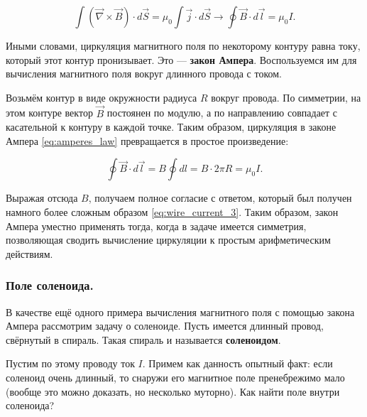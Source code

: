 \documentclass[a4paper,12pt]{article}
\numberwithin{equation}{section}
\newcommand{\vn}{\vec{\nabla}}
\begin{document}
\begin{equation}
  \label{eq:amperes_law}
  \int \left( \vn \times \vec{B} \right) \cdot d \vec{S} =
  \mu_0 \int \vec{j} \cdot d\vec{S} \rightarrow  \oint
  \vec{B} \cdot d\vec{l} = \mu_0 I.
\end{equation}

Иными словами, циркуляция магнитного поля по некоторому контуру равна
току, который этот контур пронизывает. Это --- \textbf{закон
  Ампера}. Воспользуемся им для вычисления магнитного поля вокруг
длинного провода с током. 

\begin{figure}
\centering
{}
\label{fig:current_wire_field}
\end{figure}

Возьмём контур в виде окружности радиуса $R$ вокруг провода. По
симметрии, на этом контуре вектор $\vec{B}$ постоянен по модулю, а по
направлению совпадает с касательной к контуру в каждой точке. Таким
образом, циркуляция в законе Ампера \eqref{eq:amperes_law}
превращается в простое произведение:

\begin{equation}
  \label{eq:wire_current_ampere}
  \oint \vec{B} \cdot d\vec{l} = B \oint dl = B\cdot 2\pi R = \mu_0 I.
\end{equation}

Выражая отсюда $B$, получаем полное согласие с ответом, который был
получен намного более сложным образом \eqref{eq:wire_current_3}. Таким
образом, закон Ампера уместно применять тогда, когда в задаче имеется
симметрия, позволяющая сводить вычисление циркуляции к простым
арифметическим действиям. 

\subsubsection{Поле соленоида. }
\label{sec:solenoid}

В качестве ещё одного примера вычисления магнитного поля с помощью
закона Ампера рассмотрим задачу о соленоиде. Пусть имеется длинный
провод, свёрнутый в спираль. Такая спираль и называется
\textbf{соленоидом}. 

Пустим по этому проводу ток $I$. Примем как данность опытный факт:
если соленоид очень длинный, то снаружи его магнитное поле
пренебрежимо мало (вообще это можно доказать, но несколько
муторно). Как найти поле внутри соленоида? 
\end{document}
